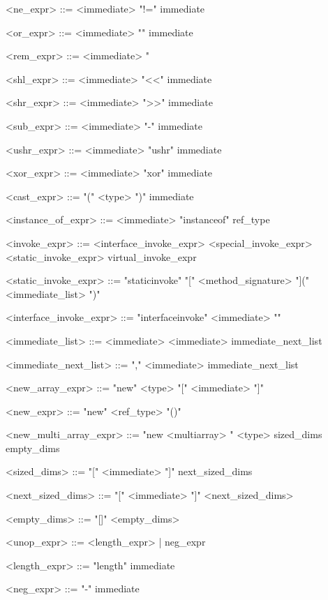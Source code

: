 \documentclass{report}
\begin{document}
\begin{grammar}
<ne_expr> ::= <immediate> "!=" immediate

<or_expr> ::= <immediate> "\alt" immediate

<rem_expr> ::= <immediate> "%

<shl_expr> ::= <immediate> "<<" immediate

<shr_expr> ::= <immediate> ">>" immediate

<sub_expr> ::= <immediate> "-" immediate

<ushr_expr> ::= <immediate> "ushr" immediate

<xor_expr> ::= <immediate> "xor" immediate

<cast_expr> ::= "(" <type> ")" immediate

<instance_of_expr> ::= <immediate> "instanceof" ref_type

<invoke_expr> ::= <interface_invoke_expr> \alt <special_invoke_expr> \alt <static_invoke_expr> virtual_invoke_expr

<static_invoke_expr> ::= "staticinvoke" "[" <method_signature> "](" <immediate_list> ")"

<interface_invoke_expr> ::= "interfaceinvoke" <immediate> ""



<immediate_list> ::= <immediate> \alt <immediate> immediate_next_list

<immediate_next_list> ::= "," <immediate> immediate_next_list

<new_array_expr> ::= "new" <type> "[" <immediate> "]"

<new_expr> ::= "new" <ref_type> "()"

<new_multi_array_expr> ::= "new <multiarray> " <type> sized_dims empty_dims

<sized_dims> ::= "[" <immediate> "]" next_sized_dims

<next_sized_dims> ::= "[" <immediate> "]" <next_sized_dims>

<empty_dims> ::= "[]" <empty_dims> 

<unop_expr> ::= <length_expr> | neg_expr

<length_expr> ::= "length" immediate

<neg_expr> ::= "-" immediate


\end{grammar}
\end{document}

